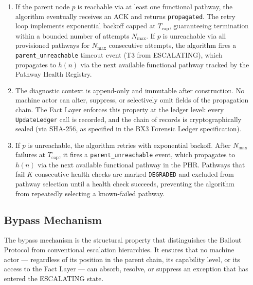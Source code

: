 \begin{enumerate}
\item[\emph{Progress.}] If the parent node $p$ is reachable via at least one functional pathway, the algorithm eventually receives an ACK and returns \texttt{propagated}. The retry loop implements exponential backoff capped at $T_{\text{cap}}$, guaranteeing termination within a bounded number of attempts $N_{\max}$. If $p$ is unreachable via all provisioned pathways for $N_{\max}$ consecutive attempts, the algorithm fires a \texttt{parent\_unreachable} timeout event (T3 from ESCALATING), which propagates to $h(n)$ via the next available functional pathway tracked by the Pathway Health Registry.

\item[\emph{Integrity.}] The diagnostic context is append-only and immutable after construction. No machine actor can alter, suppress, or selectively omit fields of the propagation chain. The Fact Layer enforces this property at the ledger level: every \texttt{UpdateLedger} call is recorded, and the chain of records is cryptographically sealed (via SHA-256, as specified in the BX3 Forensic Ledger specification).

\item[\emph{Liveness under pathway degradation.}] If $p$ is unreachable, the algorithm retries with exponential backoff. After $N_{\max}$ failures at $T_{\text{cap}}$, it fires a \texttt{parent\_unreachable} event, which propagates to $h(n)$ via the next available functional pathway in the PHR. Pathways that fail $K$ consecutive health checks are marked \texttt{DEGRADED} and excluded from pathway selection until a health check succeeds, preventing the algorithm from repeatedly selecting a known-failed pathway.
\end{enumerate}

\subsection{Bypass Mechanism}\label{sec:bypass-mechanism}

The bypass mechanism is the structural property that distinguishes the Bailout Protocol from conventional escalation hierarchies. It ensures that no machine actor — regardless of its position in the parent chain, its capability level, or its access to the Fact Layer — can absorb, resolve, or suppress an exception that has entered the ESCALATING state.

